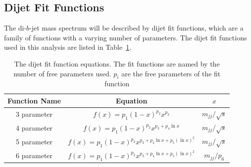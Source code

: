 \subsection{Dijet Fit Functions}
\label{sec:bkg-func}



The di-$b$-jet mass spectrum will be described by dijet fit functions,
which are a family of functions with a varying number of parameters.
The dijet fit functions used in this analysis are listed in Table~\ref{tab:bkg-fit}.

{\renewcommand{\arraystretch}{1.2}
\begin{table}[!thb]
\centering
\begin{tabular}{|c||c|c|}
  \hline
  Function Name & Equation                                          & $x$ \\
  \hline
  3 parameter   & $f(x)=p_1(1-x)^{p_2}x^{p_3}$                         & $m_{jj}/\sqrt{s}$ \\
  4 parameter   & $f(x)=p_1(1-x)^{p_2}x^{p_3+p_4\ln{x}}$                &$m_{jj}/\sqrt{s}$\\
  5 parameter   & $f(x)=p_1(1-x)^{p_2}x^{p_3+p_4\ln{x}+p_5(\ln{x})^{2}}$   & $m_{jj}/\sqrt{s}$\\ 
  6 parameter   & $f(x)=p_1(1-x)^{p_2}x^{p_3+p_4\ln{x}+p_5(\ln{x})^{2}}$   &  $m_{jj}/p_6$\\ 
  \hline
\end{tabular}
\caption{The dijet fit function equations. The fit functions are named by the number of free parameters used. $p_{i}$ are the free parameters of the fit function}
\label{tab:bkg-fit}
\end{table}}

